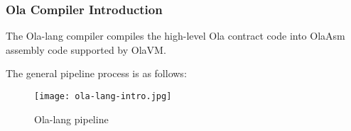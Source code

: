 \subsubsection{Ola Compiler Introduction}

The Ola-lang compiler compiles the high-level Ola contract code into OlaAsm assembly code supported by OlaVM. 

The general pipeline process is as follows:

\begin{figure}[!htp]
    \centering
    \texttt{[image: ola-lang-intro.jpg]}
    \caption{Ola-lang pipeline}
    \label{fig:ola-lang-intro}
\end{figure}